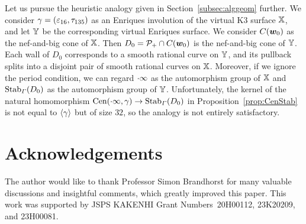 \documentclass{amsart} %
\begin{document}
 \begin{remark}
 Let us pursue the heuristic analogy given in Section~\ref{subsec:alggeom} further.
We consider $\gamma=(\varepsilon_{16}, \tau_{135})$ as an Enriques involution of 
the virtual K3 surface $\mathord{\mathbb{X}}$,
and let $\mathord{\mathbb{Y}}$ be the corresponding virtual Enriques surface.
We consider $\mathord{C}(\boldsymbol{w}_0)$ as the nef-and-big cone of $\mathord{\mathbb{X}}$.
Then $D_0=\mathord{\mathcal{P}}_{+}\cap \mathord{C}(\boldsymbol{w}_0)$ is the nef-and-big cone of $\mathord{\mathbb{Y}}$.
Each wall of $D_0$ corresponds to a smooth rational curve on $\mathord{\mathbb{Y}}$,
and its pullback  splits into a disjoint pair of smooth rational curves on $\mathord{\mathbb{X}}$.
Moreover, if we ignore the period condition, 
we can regard $\cdot \infty$ as the automorphism group of $\mathord{\mathbb{X}}$ 
and $\operatorname{Stab}_{\varGamma}(D_0)$  as the automorphism group of $\mathord{\mathbb{Y}}$.
Unfortunately, the kernel of 
the natural homomorphism $\mathrm{Cen}(\cdot \infty,\gamma)\to\operatorname{Stab}_{\varGamma}(D_0)$ in 
Proposition~\ref{prop:CenStab} is not equal to $\langle {\gamma} \rangle$  but  of size $32$, 
so the analogy is not entirely satisfactory.
 \end{remark}
 
\section*{Acknowledgements}
The author would like to thank Professor Simon Brandhorst for many valuable discussions and insightful comments, which greatly improved this paper.
This work was supported by JSPS KAKENHI Grant Numbers~20H00112, 23K20209, and 23H00081.

 
%
%



%
\end{document}
